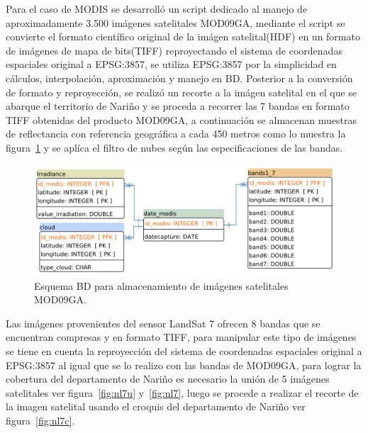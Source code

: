 Para el caso de MODIS se desarrolló un script dedicado al manejo de aproximadamente 3.500 imágenes satelitales MOD09GA, mediante el script se convierte 
el formato científico original de la imágen satelital(HDF) en un formato de imágenes de mapa de bits(TIFF) reproyectando el sistema de coordenadas 
espaciales original a  EPSG:3857, se utiliza EPSG:3857 por la simplicidad en cálculos, interpolación, aproximación y manejo en BD. Posterior a la conversión 
de formato y reproyección, se realizó un recorte a la imágen satelital en el que se abarque el territorio de Nariño y se proceda a recorrer las 7 bandas en 
formato TIFF obtenidas del producto MOD09GA, a continuación se almacenan muestras de reflectancia con referencia geográfica a cada 450 metros como lo muestra 
la figura~\ref{fig:dbmodis} y se aplíca el filtro de nubes según las especificaciones de las bandas\cite{bandMODISspecification}.
\begin{figure}[htb]
  \centering 
  \includegraphics[scale=0.4]{pictures/bdmodis.pdf}
  \caption{Esquema BD para almacenamiento de imágenes satelitales MOD09GA.} 
  \label{fig:dbmodis}
\end{figure}
\newpage
Las imágenes provenientes del sensor LandSat 7 ofrecen 8 bandas que se encuentran compresas y en formato TIFF, para manipular este tipo de imágenes
se tiene en cuenta la reproyección del sistema de coordenadas espaciales original a  EPSG:3857 al igual que se lo realizo con las bandas de MOD09GA, 
para lograr la cobertura del departamento de Nariño es necesario la unión de 5 imágenes satelitales ver figura~\ref{fig:nl7u} y~\ref{fig:nl7}, luego se 
procede a realizar el recorte de la imagen satelital usando el croquis del departamento de Nariño ver figura~\ref{fig:nl7c}.
